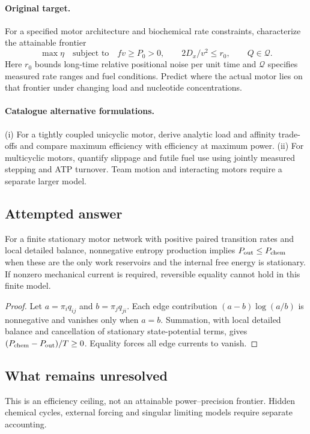 \documentclass[11pt]{article}
\begin{document}
\paragraph{Original target.}
For a specified motor architecture and biochemical rate constraints, characterize the attainable frontier
\[\max\eta\quad\text{subject to}\quad fv\ge P_0>0,\qquad 2D_x/v^2\le r_0,\qquad Q\in\mathcal Q.\]
Here $r_0$ bounds long-time relative positional noise per unit time and $\mathcal Q$ specifies measured rate ranges and fuel conditions. Predict where the actual motor lies on that frontier under changing load and nucleotide concentrations.
\paragraph{Catalogue alternative formulations.}
(i) For a tightly coupled unicyclic motor, derive analytic load and affinity trade-offs and compare maximum efficiency with efficiency at maximum power. (ii) For multicyclic motors, quantify slippage and futile fuel use using jointly measured stepping and ATP turnover. Team motion and interacting motors require a separate larger model.
\subsection{Attempted answer}
\begin{proposition}
For a finite stationary motor network with positive paired transition rates and local detailed balance, nonnegative entropy production implies $P_{\rm out}\leq P_{\rm chem}$ when these are the only work reservoirs and the internal free energy is stationary. If nonzero mechanical current is required, reversible equality cannot hold in this finite model.
\end{proposition}
\begin{proof}
Let $a=\pi_iq_{ij}$ and $b=\pi_jq_{ji}$. Each edge contribution $(a-b)\log(a/b)$ is nonnegative and vanishes only when $a=b$. Summation, with local detailed balance and cancellation of stationary state-potential terms, gives $(P_{\rm chem}-P_{\rm out})/T\geq0$. Equality forces all edge currents to vanish.
\end{proof}
\subsection{What remains unresolved}
This is an efficiency ceiling, not an attainable power--precision frontier. Hidden chemical cycles, external forcing and singular limiting models require separate accounting.
\end{document}
